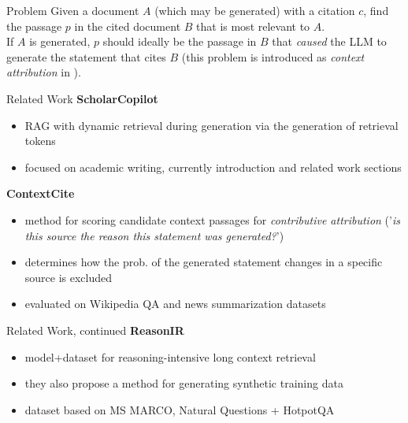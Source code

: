 \begin{frame}{Problem}
    Given a document $A$ (which may be generated) with a citation $c$, find the passage $p$ in the cited document $B$ that is most relevant to $A$.\\
    \bigskip
    If $A$ is generated, $p$ should ideally be the passage in $B$ that \emph{caused} the LLM to generate the statement that cites $B$ (this problem is introduced as \emph{context attribution} in \cite{cohenwang2024contextciteattributingmodelgeneration}). 
\end{frame}

\begin{frame}{Related Work}
    \textbf{ScholarCopilot} \cite{wang2025scholarcopilot}\\
    \begin{itemize}
        \item RAG with dynamic retrieval during generation via the generation of retrieval tokens
        \item focused on academic writing, currently introduction and related work sections 
    \end{itemize}
    \bigskip
    \textbf{ContextCite} \cite{cohenwang2024contextciteattributingmodelgeneration}\\
    \begin{itemize}
        \item method for scoring candidate context passages for \emph{contributive attribution} ('\emph{is this source the reason this statement was generated?}')
        \item determines how the prob. of the generated statement changes in a specific source is excluded
        \item evaluated on Wikipedia QA and news summarization datasets
    \end{itemize}
\end{frame}

\begin{frame}{Related Work, continued}
    \textbf{ReasonIR} \cite{shao2025reasonirtrainingretrieversreasoning}\\
    \begin{itemize}
        \item model+dataset for reasoning-intensive long context retrieval
        \item they also propose a method for generating synthetic training data
        \item dataset based on MS MARCO, Natural Questions + HotpotQA
    \end{itemize}
\end{frame}

